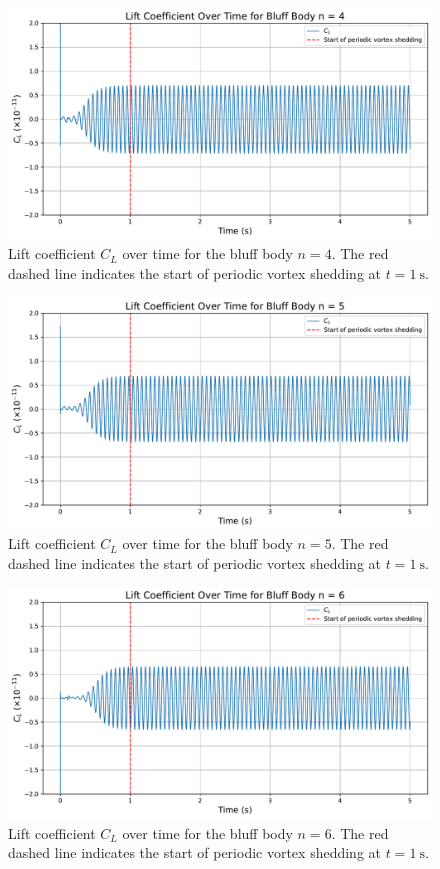 \begin{figure}[H]
	\centering
	\includegraphics[width=\textwidth]{images/4face_graph}
	\caption{Lift coefficient $C_L$ over time for the bluff body $n=4$. The red dashed line indicates the start of periodic vortex shedding at $t = \SI{1}{\second}$.}
	\label{fig:4FaceGraph} 
\end{figure}

\begin{figure}[H]
	\centering
	\includegraphics[width=\textwidth]{images/5face_graph}
	\caption{Lift coefficient $C_L$ over time for the bluff body $n=5$. The red dashed line indicates the start of periodic vortex shedding at $t = \SI{1}{\second}$.}
	\label{fig:5FaceGraph} 
\end{figure}

\begin{figure}[H]
	\centering
	\includegraphics[width=\textwidth]{images/6face_graph}
	\caption{Lift coefficient $C_L$ over time for the bluff body $n=6$. The red dashed line indicates the start of periodic vortex shedding at $t = \SI{1}{\second}$.}
	\label{fig:6FaceGraph} 
\end{figure}

